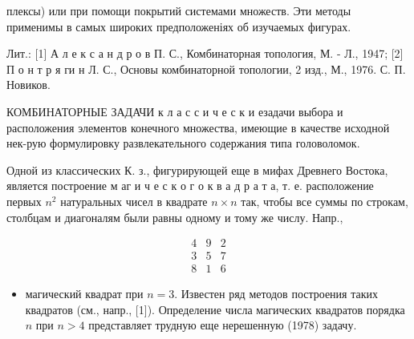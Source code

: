 \documentclass[10pt]{article}
\begin{document}
плексы) или при помощи покрытий системами множеств. Эти методы применимы в самых широких предположеніях об изучаемых фигурах.



Лит.: [1] А л е к с а н д р о в П. С., Комбинаторная топология, М. - Л., 1947; [2] П о н т р я ги н Л. С., Основы комбинаторной топологии, 2 изд., М., 1976. С. П. Новиков.



КОМБИНАТОРНЫЕ ЗАДАЧИ к л а с с и ч е с к и езадачи выбора и расположения элементов конечного множества, имеющие в качестве исходной нек-рую формулировку развлекательного содержания типа головоломок.



Одной из классических К. з., фигурирующей еще в мифах Древнего Востока, является построение м аг и ч е с к о г о к в а д р а т а, т. е. расположение первых $n^{2}$ натуральных чисел в квадрате $n \times n$ так, чтобы все суммы по строкам, столбцам и диагоналям были равны одному и тому же числу. Напр.,



\[

\begin{array}{lll}

4 & 9 & 2 \\

3 & 5 & 7 \\

8 & 1 & 6

\end{array}

\]



\begin{itemize}

  \item магический квадрат при $n=3$. Известен ряд методов построения таких квадратов (см., напр., [1]). Определение числа магических квадратов порядка $n$ при $n>4$ представляет трудную еще нерешенную (1978) задачу.

\end{itemize}
\end{document}
